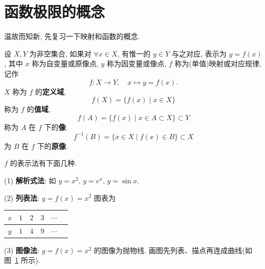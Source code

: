 \section{函数极限的概念}\label{sec:2.1}

温故而知新, 先复习一下映射和函数的概念.

\begin{definition}\label{def:2.1.1}
设 $X, Y$ 为非空集合, 如果对 $\forall x \in X$, 有惟一的 $y \in Y$ 与之对应, 表示为 $y = f(x)$, 其中 $x$ 称为自变量或原像点, $y$ 称为因变量或像点, $f$ 称为(单值)映射或对应规律, 记作
\[
f\colon X\to Y,\quad x\mapsto y = f(x).
\]
$X$ 称为 $f$ 的\textbf{定义域},
\[
f(X)=\{f(x)\mid x\in X\}
\]
称为 $f$ 的\textbf{值域},
\[
f(A)=\{f(x)\mid x\in A\subset X\}\subset Y
\]
称为 $A$ 在 $f$ 下的\textbf{像}.
\[
f^{-1}(B)=\{x\in X\mid f(x)\in B\}\subset X
\]
为 $B$ 在 $f$ 下的\textbf{原像}.
\end{definition}

$f$ 的表示法有下面几种.

(1) \textbf{解析式法}: 如 $y=x^{2}$, $y=e^{x}$, $y=\sin x$.

(2) \textbf{列表法}: $y=f(x)=x^{2}$ 图表为
\begin{center}
\begin{tabular}{c|ccccc}
\hline
$x$ & $1$ & $2$ & $3$ & $\cdots$ \\
\hline
$y$ & $1$ & $4$ & $9$ & $\cdots$ \\
\hline
\end{tabular}
\end{center}

(3) \textbf{图像法}: $y = f(x) = x^{2}$ 的图像为抛物线. 画图先列表、描点再连成曲线(如图~\ref{fig:2.1.1} 所示).

\begin{figure}[htbp]
\centering
{}
\caption{}\label{fig:2.1.1}
\end{figure}


